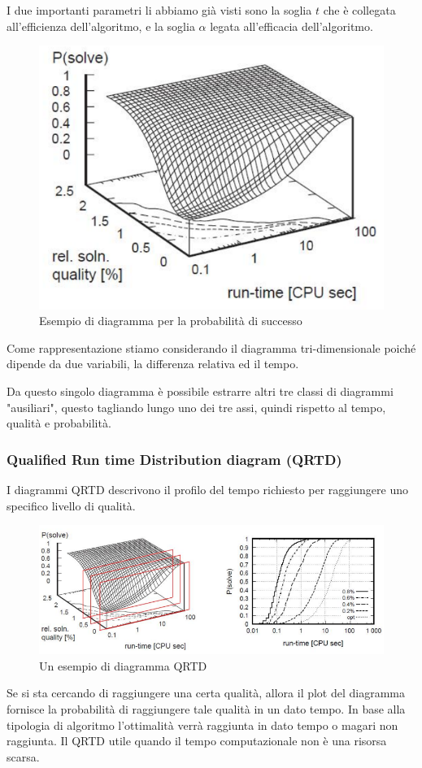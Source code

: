 \documentclass{article}
\begin{document}
I due importanti parametri li abbiamo già visti sono la soglia $t$ che è collegata
all'efficienza dell'algoritmo, e la soglia $\alpha$ legata all'efficacia dell'algoritmo.
\begin{figure}[H]
    \centering
    \includegraphics[scale=0.5]{images/prob_succ.png}
    \caption{Esempio di diagramma per la probabilità di successo}
\end{figure}
Come rappresentazione stiamo considerando il diagramma tri-dimensionale poiché
dipende da due variabili, la differenza relativa ed il tempo.

Da questo singolo diagramma è possibile estrarre altri tre classi di diagrammi "ausiliari",
questo tagliando lungo uno dei tre assi, quindi rispetto al tempo, qualità e probabilità.

\subsubsection{Qualified Run time Distribution diagram (QRTD)}
I diagrammi QRTD descrivono il profilo del tempo richiesto per raggiungere uno
specifico livello di qualità.
\begin{figure}[H]
    \centering
    \includegraphics[scale=0.55]{images/qrtd.png}
    \caption{Un esempio di diagramma QRTD}
\end{figure}
Se si sta cercando di raggiungere una certa qualità, allora il plot del diagramma
fornisce la probabilità di raggiungere tale qualità in un dato tempo. In
base alla tipologia di algoritmo l'ottimalità verrà raggiunta in dato tempo o
magari non raggiunta.
Il QRTD utile quando il tempo computazionale non è una risorsa scarsa.
\end{document}
